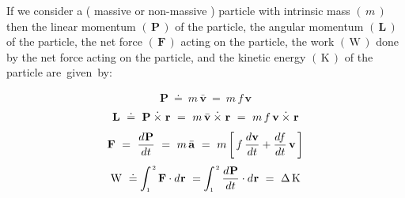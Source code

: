 \documentclass[10pt,fleqn]{article}
\begin{document}
\noindent If we consider a ( massive or non-massive ) particle with intrinsic mass $( \, m \, )$ then the linear momentum $( \, \mathbf{P} \, )$ of the particle, the angular momentum $( \, \mathbf{L} \, )$ of the particle, the net force $( \, \mathbf{F} \, )$ acting on the particle, the work $( \, \mathrm{W} \, )$ done by the net force acting on the particle, and the kinetic energy $( \, \mathrm{K} \, )$ of the particle \hbox {are given by}:
\par \vspace{-0.30em}
\begin{eqnarray*}
\mathbf{P} ~\doteq~ m \, \bar{\mathbf{v}} ~=~ m \, f \, \mathbf{v}
\end{eqnarray*}
\vspace{-0.30em}
\begin{eqnarray*}
\mathbf{L} ~\doteq~ \mathbf{P} \hspace{+0.24em}\dot{\times}\hspace{+0.30em} \mathbf{r} ~=~ m \, \bar{\mathbf{v}} \hspace{+0.24em}\dot{\times}\hspace{+0.30em} \mathbf{r} ~=~ m \, f \, \mathbf{v} \hspace{+0.24em}\dot{\times}\hspace{+0.30em} \mathbf{r}
\end{eqnarray*}
\vspace{-0.30em}
\begin{eqnarray*}
\mathbf{F} ~=~ \dfrac{d\hspace{+0.045em}\mathbf{P}}{d\hspace{+0.012em}t} ~=~ m \, \bar{\mathbf{a}} ~=~ m \, \bigg [ \, f \, \dfrac{d\hspace{+0.021em}\mathbf{v}}{d\hspace{+0.012em}t} + \dfrac{d\hspace{-0.12em}f}{d\hspace{+0.012em}t} \, \mathbf{v} \, \bigg ]
\end{eqnarray*}
\vspace{-0.15em}
\begin{eqnarray*}
\mathrm{W} ~\doteq~ \hspace{-0.36em} \int_{\scriptscriptstyle 1}^{\hspace{+0.09em}{\scriptscriptstyle 2}} \mathbf{F} \cdot d\hspace{+0.036em}\mathbf{r} ~=~ \hspace{-0.36em} \int_{\scriptscriptstyle 1}^{\hspace{+0.09em}{\scriptscriptstyle 2}} \dfrac{d\hspace{+0.045em}\mathbf{P}}{d\hspace{+0.012em}t} \cdot d\hspace{+0.036em}\mathbf{r} ~=~ \Delta \, \mathrm{K}
\end{eqnarray*}
\end{document}
